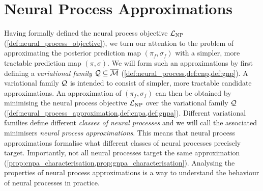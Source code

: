 \documentclass[12pt, twoside]{report}
\begin{document}
\section{Neural Process Approximations}
\label{sec:predmap:np_approximations}
Having formally defined the neural process objective $\L\ss{NP}$ (\cref{def:neural_process_objective}), we turn our attention to the problem of approximating the posterior prediction map $(\pi_f, \sigma_f)$ with a simpler, more tractable prediction map $(\pi, \sigma)$.
We will form such an approximations by first defining a \emph{variational family} $\mathcal{Q} \subseteq \overline{\mathcal{M}}$ (\cref{def:neural_process,def:cnp,def:gnp}).
A variational family $\mathcal{Q}$ is intended to consist of simpler, more tractable candidate approximations.
An approximation of $(\pi_f, \sigma_f)$ can then be obtained by
minimising the neural process objective $\L\ss{NP}$ over the variational family $\mathcal{Q}$ (\cref{def:neural_process_approximation,def:cnpa,def:gnpa}).
Different variational families define different \emph{classes of neural processes} and we will call the associated minimisers \emph{neural process approximations}.
This means that neural process approximations formalise what different classes of neural processes precisely target.
Importantly, not all neural processes target the same approximation (\cref{prop:cnpa_characterisation,prop:gnpa_characterisation}).
Analysing the properties of neural process approximations is a way to understand the behaviour of neural processes in practice.
\end{document}
